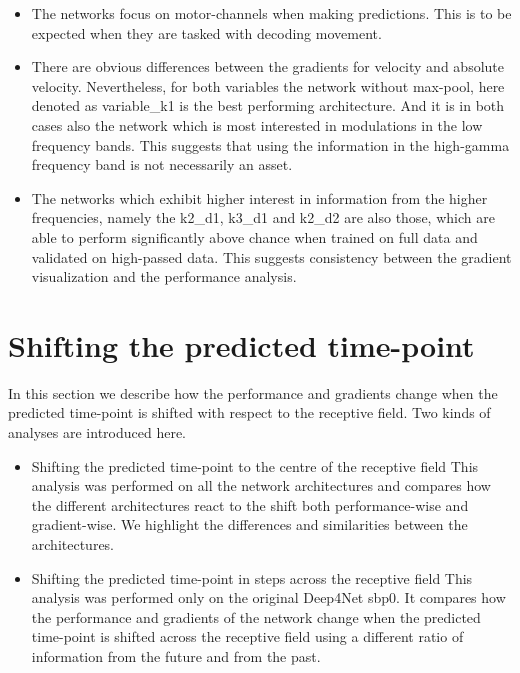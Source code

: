 \begin{itemize}
    \item The networks focus on motor-channels when making predictions.
This is to be expected when they are tasked with decoding movement.
    \item There are obvious differences between the gradients for velocity and absolute velocity.
    Nevertheless, for both variables the network without max-pool, here denoted as {variable}_k1 is the best performing architecture.
    And it is in both cases also the network which is most interested in modulations in the low frequency bands.
    This suggests that using the information in the high-gamma frequency band is not necessarily an asset.
    \item The networks which exhibit higher interest in information from the higher frequencies, namely the k2\_d1, k3\_d1 and k2\_d2 are also those, which are able to perform significantly above chance when trained on full data and validated on high-passed data.
    This suggests consistency between the gradient visualization and the performance analysis.

\end{itemize}


\section{Shifting the predicted time-point}\label{sec:shifting-the-predicted-time-point}
In this section we describe how the performance and gradients change when the predicted time-point is shifted with respect to the receptive field.
Two kinds of analyses are introduced here.
\begin{itemize}
    \item Shifting the predicted time-point to the centre of the receptive field
This analysis was performed on all the network architectures and compares how the different architectures react to the shift both performance-wise and gradient-wise.
We highlight the differences and similarities between the architectures.
    \item Shifting the predicted time-point in steps across the receptive field
This analysis was performed only on the original Deep4Net sbp0.
It compares how the performance and gradients of the network change when the predicted time-point is shifted across the receptive field using a different ratio of information from the future and from the past.
\end{itemize}


